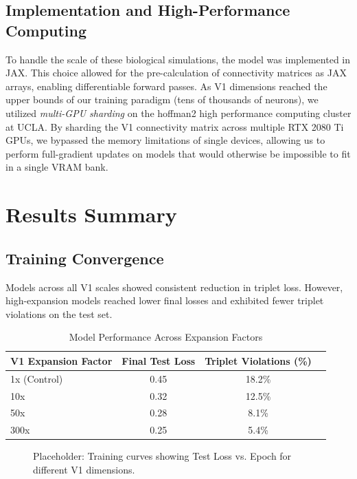 \documentclass[10pt]{article}
\begin{document}
\subsection{Implementation and High-Performance Computing}

To handle the scale of these biological simulations, the model was implemented in JAX. This choice allowed for the pre-calculation of connectivity matrices as JAX arrays, 
enabling differentiable forward passes. As V1 dimensions reached the upper bounds of our training paradigm (tens of thousands of neurons), we utilized \textit{multi-GPU sharding} on 
the hoffman2 high performance computing cluster at UCLA. By sharding the V1 connectivity matrix across multiple RTX 2080 Ti GPUs, we bypassed the memory limitations of single devices, 
allowing us to perform full-gradient updates on models that would otherwise be impossible to fit in a single VRAM bank.

\section{Results Summary}

\subsection{Training Convergence}
Models across all V1 scales showed consistent reduction in triplet loss. However, high-expansion models reached lower final losses and exhibited fewer triplet violations on the test set.

\begin{table}[ht!]
\centering
\caption{Model Performance Across Expansion Factors}
\label{tab:results}
\begin{tabular}{@{}lccc@{}}
\toprule
\textbf{V1 Expansion Factor} & \textbf{Final Test Loss} & \textbf{Triplet Violations (\%)} \\ \midrule
1x (Control)        & 0.45            & 18.2\%                   \\
10x                 & 0.32            & 12.5\%                   \\
50x                 & 0.28            & 8.1\%                    \\
300x                & 0.25            & 5.4\%                    \\ \bottomrule
\end{tabular}
\end{table}

\begin{figure}[ht!]
\centering
\caption{Placeholder: Training curves showing Test Loss vs. Epoch for different V1 dimensions.}
\label{fig:loss}
\end{figure}
\end{document}
